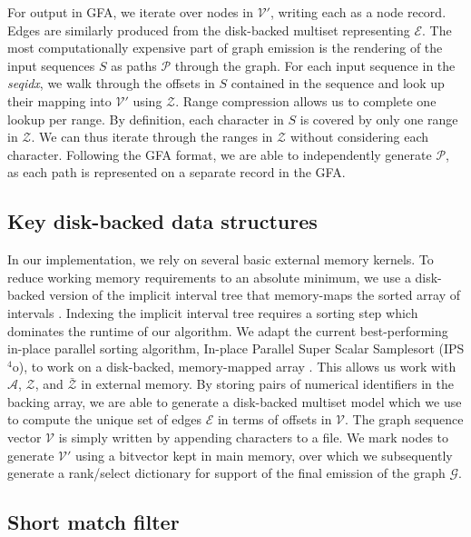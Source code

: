 \documentclass{bioinfo}
\theoremstyle{definition}
\begin{document}
For output in GFA, we iterate over nodes in $\mathcal{V}'$, writing each as a node record.
Edges are similarly produced from the disk-backed multiset representing $\mathcal{E}$.
The most computationally expensive part of graph emission is the rendering of the input sequences $S$ as paths $\mathcal{P}$ through the graph.
For each input sequence in the \textit{seqidx}, we walk through the offsets in $S$ contained in the sequence and look up their mapping into $\mathcal{V}'$ using $\mathcal{Z}$.
Range compression allows us to complete one lookup per range.
By definition, each character in $S$ is covered by only one range in $\mathcal{Z}$.
We can thus iterate through the ranges in $\mathcal{Z}$ without considering each character.
Following the GFA format, we are able to independently generate $\mathcal{P}$, as each path is represented on a separate record in the GFA.

\subsection{Key disk-backed data structures}

In our implementation, we rely on several basic external memory kernels.
To reduce working memory requirements to an absolute minimum, we use a disk-backed version of the implicit interval tree that memory-maps the sorted array of intervals \citep{mmmulti}.
Indexing the implicit interval tree requires a sorting step which dominates the runtime of our algorithm.
We adapt the current best-performing in-place parallel sorting algorithm, In-place Parallel Super Scalar Samplesort (IPS$^4$o), to work on a disk-backed, memory-mapped array \citep{axtmann2017}.
This allows us work with $\mathcal{A}$, $\mathcal{Z}$, and $\bar{\mathcal{Z}}$ in external memory.
By storing pairs of numerical identifiers in the backing array, we are able to generate a disk-backed multiset model which we use to compute the unique set of edges $\mathcal{E}$ in terms of offsets in $\mathcal{V}$.
The graph sequence vector $\mathcal{V}$ is simply written by appending characters to a file.
We mark nodes to generate $\mathcal{V}'$ using a bitvector kept in main memory, over which we subsequently generate a rank/select dictionary \citep{Gog_2014} for support of the final emission of the graph $\mathcal{G}$.

\subsection{Short match filter}
\label{sec:filter}
\end{document}
